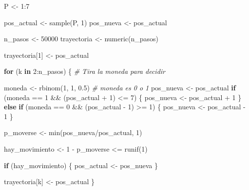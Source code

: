 \documentclass[
  12pt,
]{book}
\newenvironment{Shaded}{\begin{snugshade}}{\end{snugshade}}
\newcommand{\CommentTok}[1]{\textcolor[rgb]{0.56,0.35,0.01}{\textit{#1}}}
\newcommand{\ControlFlowTok}[1]{\textcolor[rgb]{0.13,0.29,0.53}{\textbf{#1}}}
\newcommand{\DecValTok}[1]{\textcolor[rgb]{0.00,0.00,0.81}{#1}}
\newcommand{\FloatTok}[1]{\textcolor[rgb]{0.00,0.00,0.81}{#1}}
\newcommand{\FunctionTok}[1]{\textcolor[rgb]{0.00,0.00,0.00}{#1}}
\newcommand{\NormalTok}[1]{#1}
\newcommand{\OtherTok}[1]{\textcolor[rgb]{0.56,0.35,0.01}{#1}}
\newcommand{\SpecialCharTok}[1]{\textcolor[rgb]{0.00,0.00,0.00}{#1}}
\theoremstyle{definition}
\theoremstyle{definition}
\theoremstyle{definition}
\theoremstyle{definition}
\theoremstyle{remark}
\begin{document}
\begin{Shaded}
\begin{Highlighting}[]
\NormalTok{P }\OtherTok{\textless{}{-}} \DecValTok{1}\SpecialCharTok{:}\DecValTok{7}

\NormalTok{pos\_actual }\OtherTok{\textless{}{-}} \FunctionTok{sample}\NormalTok{(P, }\DecValTok{1}\NormalTok{)}
\NormalTok{pos\_nueva }\OtherTok{\textless{}{-}}\NormalTok{ pos\_actual}

\NormalTok{n\_pasos }\OtherTok{\textless{}{-}} \DecValTok{50000}
\NormalTok{trayectoria }\OtherTok{\textless{}{-}} \FunctionTok{numeric}\NormalTok{(n\_pasos)}

\NormalTok{trayectoria[}\DecValTok{1}\NormalTok{] }\OtherTok{\textless{}{-}}\NormalTok{ pos\_actual}

\ControlFlowTok{for}\NormalTok{ (k }\ControlFlowTok{in} \DecValTok{2}\SpecialCharTok{:}\NormalTok{n\_pasos) \{}
    \CommentTok{\# Tira la moneda para decidir}

\NormalTok{    moneda }\OtherTok{\textless{}{-}} \FunctionTok{rbinom}\NormalTok{(}\DecValTok{1}\NormalTok{, }\DecValTok{1}\NormalTok{, }\FloatTok{0.5}\NormalTok{)}
    \CommentTok{\# moneda es 0 o 1}
\NormalTok{    pos\_nueva }\OtherTok{\textless{}{-}}\NormalTok{ pos\_actual}
    \ControlFlowTok{if}\NormalTok{ (moneda }\SpecialCharTok{==} \DecValTok{1} \SpecialCharTok{\&\&}\NormalTok{ (pos\_actual }\SpecialCharTok{+} \DecValTok{1}\NormalTok{) }\SpecialCharTok{\textless{}=} \DecValTok{7}\NormalTok{) \{}
\NormalTok{        pos\_nueva }\OtherTok{\textless{}{-}}\NormalTok{ pos\_actual }\SpecialCharTok{+} \DecValTok{1}
\NormalTok{    \} }\ControlFlowTok{else} \ControlFlowTok{if}\NormalTok{ (moneda }\SpecialCharTok{==} \DecValTok{0} \SpecialCharTok{\&\&}\NormalTok{ (pos\_actual }\SpecialCharTok{{-}} \DecValTok{1}\NormalTok{) }\SpecialCharTok{\textgreater{}=} \DecValTok{1}\NormalTok{) \{}
\NormalTok{        pos\_nueva }\OtherTok{\textless{}{-}}\NormalTok{ pos\_actual }\SpecialCharTok{{-}} \DecValTok{1}
\NormalTok{    \}}

\NormalTok{    p\_moverse }\OtherTok{\textless{}{-}} \FunctionTok{min}\NormalTok{(pos\_nueva}\SpecialCharTok{/}\NormalTok{pos\_actual, }\DecValTok{1}\NormalTok{)}

\NormalTok{    hay\_movimiento }\OtherTok{\textless{}{-}} \DecValTok{1} \SpecialCharTok{{-}}\NormalTok{ p\_moverse }\SpecialCharTok{\textless{}=} \FunctionTok{runif}\NormalTok{(}\DecValTok{1}\NormalTok{)}

    \ControlFlowTok{if}\NormalTok{ (hay\_movimiento) \{}
\NormalTok{        pos\_actual }\OtherTok{\textless{}{-}}\NormalTok{ pos\_nueva}
\NormalTok{    \}}

\NormalTok{    trayectoria[k] }\OtherTok{\textless{}{-}}\NormalTok{ pos\_actual}
\NormalTok{\}}
\end{Highlighting}
\end{Shaded}
\end{document}
